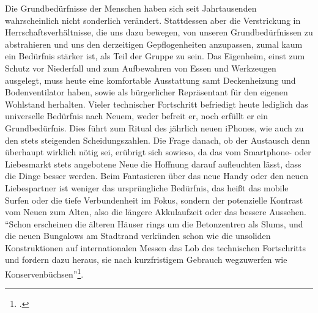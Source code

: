 \documentclass[a4paper, 12pt]{article}
\begin{document}
\begin{onehalfspace}
Die Grundbedürfnisse der Menschen haben sich seit Jahrtausenden wahrscheinlich nicht sonderlich verändert. Stattdessen aber die Verstrickung in Herrschaftsverhältnisse, die uns dazu bewegen, von unseren Grundbedürfnissen zu abstrahieren und uns den derzeitigen Gepflogenheiten anzupassen, zumal kaum ein Bedürfnis stärker ist, als Teil der Gruppe zu sein. Das Eigenheim, einst zum Schutz vor Niederfall und zum Aufbewahren von Essen und Werkzeugen ausgelegt, muss heute eine komfortable Ausstattung samt Deckenheizung und Bodenventilator haben, sowie als bürgerlicher Repräsentant für den eigenen Wohlstand herhalten. Vieler technischer Fortschritt befriedigt heute lediglich das universelle Bedürfnis nach Neuem, weder befreit er, noch erfüllt er ein Grundbedürfnis. Dies führt zum Ritual des jährlich neuen iPhones, wie auch zu den stets steigenden Scheidungszahlen. Die Frage danach, ob der Austausch denn überhaupt wirklich nötig sei, erübrigt sich sowieso, da das vom Smartphone- oder Liebesmarkt stets angebotene Neue die Hoffnung darauf aufleuchten lässt, dass die Dinge besser werden. Beim Fantasieren über das neue Handy oder den neuen Liebespartner ist weniger das ursprüngliche Bedürfnis, das heißt das mobile Surfen oder die tiefe Verbundenheit im Fokus, sondern der potenzielle Kontrast vom Neuen zum Alten, also die längere Akkulaufzeit oder das bessere Aussehen. "`Schon erscheinen die älteren Häuser rings um die Betonzentren als Slums, und die neuen Bungalows am Stadtrand verkünden schon wie die unsoliden Konstruktionen auf internationalen Messen das Lob des technischen Fortschritts und fordern dazu heraus, sie nach kurzfristigem Gebrauch wegzuwerfen wie Konservenbüchsen"'\footnote{\Cite[Siehe][S. 128]{dialektik-der-aufklaerung}.}. 


\end{onehalfspace}
\end{document}
